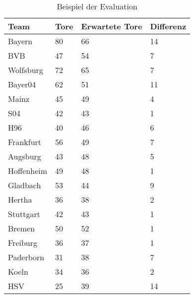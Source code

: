 \begin{table}[H]
\centering
\caption{Beispiel der Evaluation}
\label{bspeva}
\begin{tabular}{| P{2.5cm}| P{3.5cm}| P{3.5cm}| P{2.5cm}|}
\hline
\textbf{Team} & \textbf{Tore} & \textbf{Erwartete Tore} & \textbf{Differenz}        \\ \hline
Bayern        & 80            & 66                      & 14 \\ \hline
BVB           & 47            & 54                      & 7                         \\ \hline
Wolfsburg     & 72            & 65                      & 7                         \\ \hline
Bayer04       & 62            & 51                      & 11 \\ \hline
Mainz         & 45            & 49                      & 4                         \\ \hline
S04           & 42            & 43                      & 1  \\ \hline
H96           & 40            & 46                      & 6                         \\ \hline
Frankfurt     & 56            & 49                      & 7                         \\ \hline
Augsburg      & 43            & 48                      & 5                         \\ \hline
Hoffenheim    & 49            & 48                      & 1  \\ \hline
Gladbach      & 53            & 44                      & 9                         \\ \hline
Hertha        & 36            & 38                      & 2  \\ \hline
Stuttgart     & 42            & 43                      & 1  \\ \hline
Bremen        & 50            & 52                      & 1  \\ \hline
Freiburg      & 36            & 37                      & 1  \\ \hline
Paderborn     & 31            & 38                      & 7                         \\ \hline
Koeln         & 34            & 36                      & 2  \\ \hline
HSV           & 25            & 39                      & 14 \\ \hline
\end{tabular}
\end{table}

